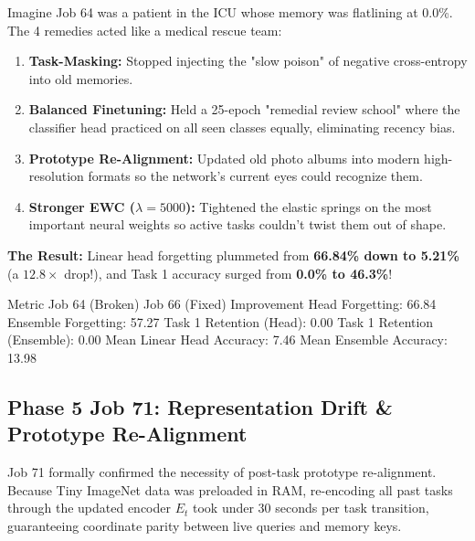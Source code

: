 \documentclass[11pt,a4paper]{article}
\begin{document}
\begin{callout}
Imagine Job 64 was a patient in the ICU whose memory was flatlining at 0.0\%. The 4 remedies acted like a medical rescue team:
\begin{enumerate}[noitemsep]
    \item \textbf{Task-Masking:} Stopped injecting the "slow poison" of negative cross-entropy into old memories.
    \item \textbf{Balanced Finetuning:} Held a 25-epoch "remedial review school" where the classifier head practiced on all seen classes equally, eliminating recency bias.
    \item \textbf{Prototype Re-Alignment:} Updated old photo albums into modern high-resolution formats so the network's current eyes could recognize them.
    \item \textbf{Stronger EWC ($\lambda=5000$):} Tightened the elastic springs on the most important neural weights so active tasks couldn't twist them out of shape.
\end{enumerate}
\textbf{The Result:} Linear head forgetting plummeted from \textbf{66.84\% down to 5.21\%} (a $12.8\times$ drop!), and Task 1 accuracy surged from \textbf{0.0\% to 46.3\%}!
\end{callout}

\begin{diagrambox}
Metric                      Job 64 (Broken)       Job 66 (Fixed)        Improvement
Head Forgetting:                 66.84%
Ensemble Forgetting:             57.27%
Task 1 Retention (Head):          0.00%
Task 1 Retention (Ensemble):      0.00%
Mean Linear Head Accuracy:        7.46%
Mean Ensemble Accuracy:          13.98%
\end{diagrambox}

\subsection{Phase 5 Job 71: Representation Drift \& Prototype Re-Alignment}
Job 71 formally confirmed the necessity of post-task prototype re-alignment. Because Tiny ImageNet data was preloaded in RAM, re-encoding all past tasks through the updated encoder $E_t$ took under 30 seconds per task transition, guaranteeing coordinate parity between live queries and memory keys.
\end{document}
